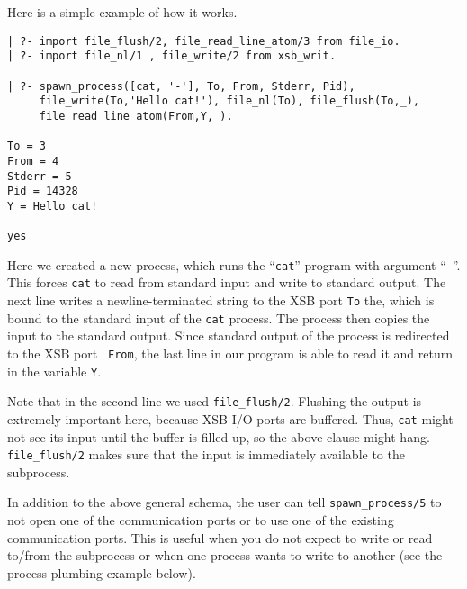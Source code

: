 \noindent
Here is a simple example of how it works.

\begin{verbatim}
| ?- import file_flush/2, file_read_line_atom/3 from file_io.
| ?- import file_nl/1 , file_write/2 from xsb_writ.  

| ?- spawn_process([cat, '-'], To, From, Stderr, Pid),
     file_write(To,'Hello cat!'), file_nl(To), file_flush(To,_),
     file_read_line_atom(From,Y,_).

To = 3
From = 4
Stderr = 5
Pid = 14328
Y = Hello cat!

yes
\end{verbatim}

Here we created a new process, which runs the ``{\tt cat}'' program
with argument ``--''. This forces {\tt cat} to read from standard input and
write to standard output. The next line writes a newline-terminated string
to the XSB port {\tt To} the, which is bound to the standard input of the
{\tt cat} process. The process then copies the input to the standard output.
Since standard output of the process is redirected to the XSB port {\tt
  From}, the last line in our program is able to read it and return in the
variable {\tt Y}.

Note that in the second line we used {\tt file\_flush/2}. Flushing the
output is extremely important here, because XSB I/O ports are buffered.
Thus, {\tt cat} might not see its input until the buffer is filled up, so
the above clause might hang. {\tt file\_flush/2} makes sure that the input
is immediately available to the subprocess.

In addition to the above general schema, the user can tell
\verb|spawn_process/5| to not open one of the communication ports or to
use one of the existing communication ports.  This is useful when you do
not expect to write or read to/from the subprocess or when one process
wants to write to another (see the process plumbing example below).


